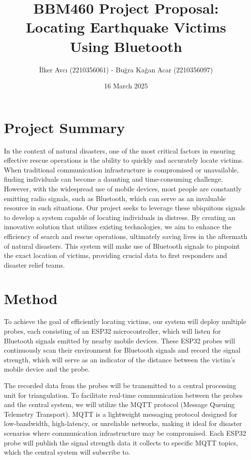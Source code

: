 \documentclass{article}
\title{BBM460 Project Proposal: Locating Earthquake Victims Using Bluetooth}
\date{16 March 2025}
\begin{document}
\maketitle
\author{
    \begin{center}
        İlker Avcı (2210356061) - Buğra Kağan Acar (2210356097)
    \end{center}
}

\section{Project Summary}

In the context of natural disasters, one of the most critical factors in ensuring effective rescue operations is the ability to quickly and accurately locate victims. When traditional communication infrastructure is compromised or unavailable, finding individuals can become a daunting and time-consuming challenge. However, with the widespread use of mobile devices, most people are constantly emitting radio signals, such as Bluetooth, which can serve as an invaluable resource in such situations. Our project seeks to leverage these ubiquitous signals to develop a system capable of locating individuals in distress. By creating an innovative solution that utilizes existing technologies, we aim to enhance the efficiency of search and rescue operations, ultimately saving lives in the aftermath of natural disasters. This system will make use of Bluetooth signals to pinpoint the exact location of victims, providing crucial data to first responders and disaster relief teams.

\section{Method}

To achieve the goal of efficiently locating victims, our system will deploy multiple probes, each consisting of an ESP32 microcontroller, which will listen for Bluetooth signals emitted by nearby mobile devices. These ESP32 probes will continuously scan their environment for Bluetooth signals and record the signal strength, which will serve as an indicator of the distance between the victim’s mobile device and the probe.

The recorded data from the probes will be transmitted to a central processing unit for triangulation. To facilitate real-time communication between the probes and the central system, we will utilize the MQTT protocol (Message Queuing Telemetry Transport). MQTT is a lightweight messaging protocol designed for low-bandwidth, high-latency, or unreliable networks, making it ideal for disaster scenarios where communication infrastructure may be compromised. Each ESP32 probe will publish the signal strength data it collects to specific MQTT topics, which the central system will subscribe to.
\end{document}
